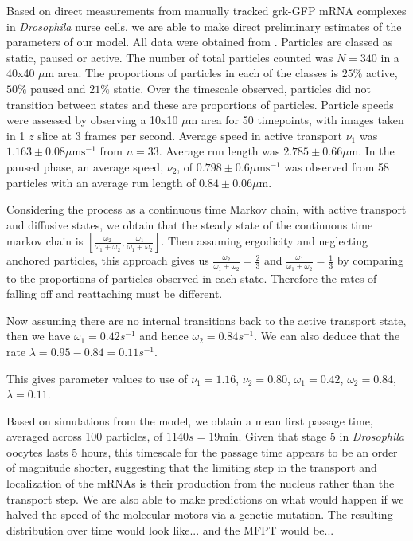 \documentclass[twocolumn]{biophys}
\begin{document}
Based on direct measurements from manually tracked grk-GFP mRNA complexes in \textit{Drosophila} nurse cells, we are able to make direct preliminary estimates of the parameters of our model.
All data were obtained from \citet{DavidsonPhD2015}.
Particles are classed as static, paused or active.
The number of total particles counted was $N=340$ in a 40x40 $\mu \text{m}$ area.
The proportions of particles in each of the classes is $25\%$ active, $50\%$ paused and $21\%$ static. 
Over the timescale observed, particles did not transition between states and these are proportions of particles. 
Particle speeds were assessed by observing a 10x10 $\mu \text{m}$ area for 50 timepoints, with images taken in 1 $z$ slice at 3 frames per second. 
Average speed in active transport $\nu_1 $ was  $1.163 \pm 0.08 \mu \text{ms}^{-1}$ from $n=33$. 
Average run length was $2.785 \pm 0.66 \mu \text{m}$. 
In the paused phase, an average speed, $\nu_2$, of $0.798 \pm 0.6 \mu \text{ms}^{-1}$ was observed from 58 particles with an average run length of  $0.84 \pm 0.06 \mu \text{m}$. 

Considering the process as a continuous time Markov chain, with active transport and diffusive states, we obtain that the steady state of the continuous time markov chain is $[\frac{\omega_2 }{\omega_1 + \omega_2},\frac{ \omega_1}{\omega_1+\omega_2}]$. 
Then assuming ergodicity and neglecting anchored particles, this approach gives us $\frac{\omega_2 }{\omega_1 + \omega_2} = \frac{2}{3}$ and $\frac{\omega_1 }{\omega_1 + \omega_2} = \frac{1}{3}$ by comparing to the proportions of particles observed in each state.
Therefore the rates of falling off and reattaching must be different.

Now assuming there are no internal transitions back to the active transport state, then we have $\omega_1 = 0.42 s^{-1}$ and hence $\omega_2 = 0.84 s^{-1}$. 
We can also deduce that the rate $\lambda = 0.95-0.84 = 0.11 s^{-1}$.  

This gives parameter values to use of $\nu_1 = 1.16$, $\nu_2 = 0.80$, $\omega_1 = 0.42 $, $\omega_2 = 0.84$, $\lambda = 0.11$.

Based on simulations from the model, we obtain a mean first passage time, averaged across 100 particles, of $1140s = 19\text{min}$.
Given that stage 5 in \textit{Drosophila} oocytes lasts 5 hours, this timescale for the passage time appears to be an order of magnitude shorter, suggesting that the limiting step in the transport and localization of the mRNAs is their production from the nucleus rather than the transport step.
We are also able to make predictions on what would happen if we halved the speed of the molecular motors via a genetic mutation. The resulting distribution over time would look like... and the MFPT would be...
\end{document}
